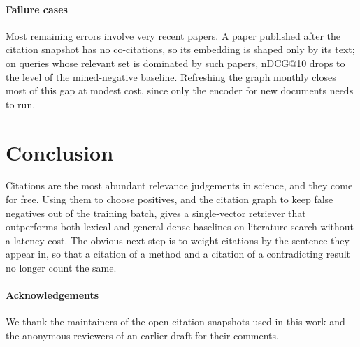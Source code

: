 \documentclass[10pt, twoside]{article}
\begin{document}
\paragraph{Failure cases}
Most remaining errors involve very recent papers. A paper published after the
citation snapshot has no co-citations, so its embedding is shaped only by its
text; on queries whose relevant set is dominated by such papers, nDCG@10 drops
to the level of the mined-negative baseline. Refreshing the graph monthly
closes most of this gap at modest cost, since only the encoder for new
documents needs to run.

\section{Conclusion}
\label{sec:conclusion}

Citations are the most abundant relevance judgements in science, and they come
for free. Using them to choose positives, and the citation graph to keep false
negatives out of the training batch, gives a single-vector retriever that
outperforms both lexical and general dense baselines on literature search
without a latency cost. The obvious next step is to weight citations by the
sentence they appear in, so that a citation of a method and a citation of a
contradicting result no longer count the same.

\paragraph{Acknowledgements}
We thank the maintainers of the open citation snapshots used in this work and
the anonymous reviewers of an earlier draft for their comments.

\printbibliography
\end{document}
